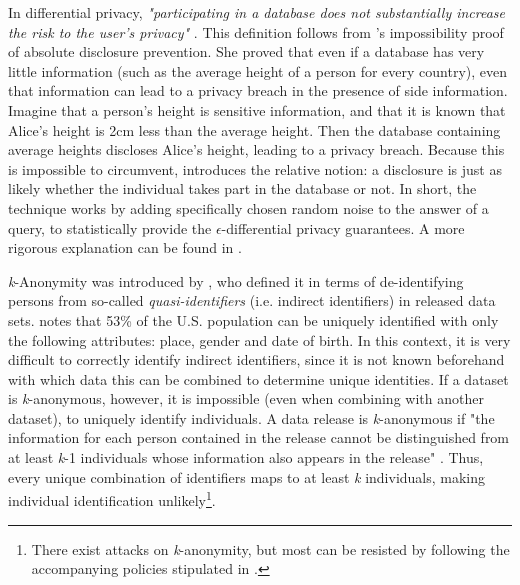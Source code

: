 In differential privacy, \textit{"participating in a database does not substantially increase the risk to the user's privacy"} \citep{diff-privacy}.  This definition follows from \citeauthor{diff-privacy}'s impossibility proof of absolute disclosure prevention. She proved that even if a database has very little information (such as the average height of a person for every country), even that information can lead to a privacy breach in the presence of side information. Imagine that a person's height is sensitive information, and that it is known that Alice's height is 2cm less than the average height. Then the database containing average heights discloses Alice's height, leading to a privacy breach. Because this is impossible to circumvent, \citeauthor{diff-privacy} introduces the relative notion: a disclosure is just as likely whether the individual takes part in the database or not. In short, the technique works by adding specifically chosen random noise to the answer of a query, to statistically provide the \textit{$\epsilon$}-differential privacy guarantees. A more rigorous explanation can be found in \citet[p9-11]{diff-privacy}.

\textit{k}-Anonymity was introduced by \citet{k-anonymity}, who defined it in terms of de-identifying persons from so-called \textit{quasi-identifiers} (i.e. indirect identifiers) in released data sets. \citet{demographics-identify-unique} notes that 53\% of the U.S. population can be uniquely identified with only the following attributes: place, gender and date of birth. In this context, it is very difficult to correctly identify indirect identifiers, since it is not known beforehand with which data this can be combined to determine unique identities. If a dataset is \textit{k}-anonymous, however, it is impossible (even when combining with another dataset), to uniquely identify individuals. A data release is \textit{k}-anonymous if "the information for each person contained in the release cannot be distinguished from at least \textit{k}-1 individuals whose information also appears in the release" \citep{k-anonymity}. Thus, every unique combination of identifiers maps to at least \textit{k} individuals, making individual identification unlikely\footnote{There exist attacks on \textit{k}-anonymity, but most can be resisted by following the accompanying policies stipulated in \citet{k-anonymity}.}.


